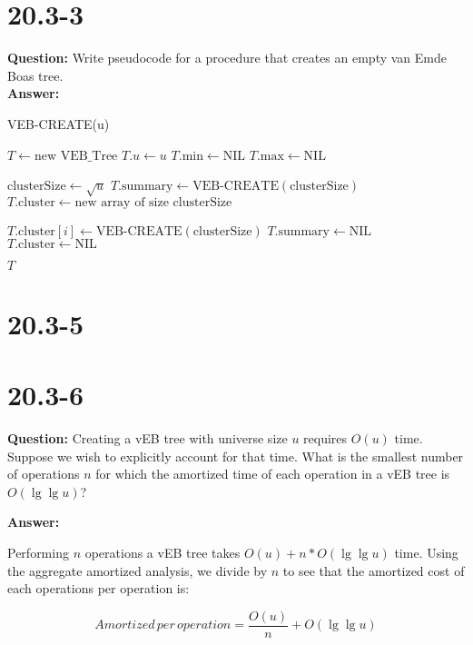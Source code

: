 \documentclass[12pt]{article}
\begin{document}
\section{20.3-3}
\textbf{Question: }Write pseudocode for a procedure that creates an empty van Emde Boas tree.\\
\textbf{Answer: }
\begin{algorithm}
\caption{VEB-CREATE(u)}
\begin{algorithmic}[1]
    \State $T \gets \text{new VEB\_Tree}$
    \State $T.u \gets u$
    \State $T.\text{min} \gets \text{NIL}$
    \State $T.\text{max} \gets \text{NIL}$
    
        \State $\text{clusterSize} \gets \sqrt{u}$
        \State $T.\text{summary} \gets \text{VEB-CREATE}(\text{clusterSize})$
        \State $T.\text{cluster} \gets \text{new array of size } \text{clusterSize}$
        
            \State $T.\text{cluster}[i] \gets \text{VEB-CREATE}(\text{clusterSize})$
        \EndFor
    \Else
        \State $T.\text{summary} \gets \text{NIL}$
        \State $T.\text{cluster} \gets \text{NIL}$
    \EndIf
    
    \State \Return $T$
\EndProcedure
\end{algorithmic}
\end{algorithm}
\section{20.3-5}

\section{20.3-6}
\textbf{Question: } 
Creating a vEB tree with universe size $u$ requires $O(u)$ time. Suppose we wish to explicitly account for that time. What is the smallest number of operations $n$ for which the amortized time of each operation in a vEB tree is $O(\lg\lg u)$?

\textbf{Answer:}

Performing $n$ operations a vEB tree takes $O(u) + n*O(\lg\lg u)$ time. Using the aggregate amortized analysis, we divide by $n$ to see that the amortized cost of each operations  per operation is:

\begin{equation}
Amortized \, per \, operation = \frac{O(u)}{n} + O(\lg\lg u) 
\end{equation} 
\end{document}
